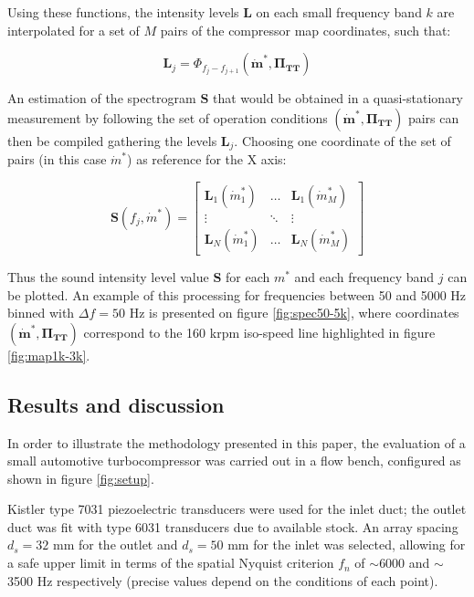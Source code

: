 Using these functions, the intensity levels $\mathbf L$ on each small frequency band $k$ are interpolated for a set of $M$ pairs of the compressor map coordinates, such that:

\begin{equation}
 \mathbf L_j=\Phi_{f_j-f_{j+1}}(\mathbf{\dot m^*},\mathbf{\Pi_\text{TT}})
\end{equation}

An estimation of the spectrogram $\mathbf S$ that would be obtained in a quasi-stationary measurement by following the set of operation conditions $(\mathbf{\dot m^*},\mathbf{\Pi_\text{TT}})$ pairs can then be compiled gathering the levels $\mathbf L_j$. Choosing one coordinate of the set of pairs (in this case $\dot m^*$) as reference for the X axis:

\begin{equation}
  \mathbf S(f_j,\dot m^*)=\begin{bmatrix}
    \mathbf L_1(\dot m^*_1) & \hdots & \mathbf L_1(\dot m^*_M)\\
    \vdots & \ddots & \vdots \\
    \mathbf L_N(\dot m^*_1) & \hdots & \mathbf L_N(\dot m^*_M)
  \end{bmatrix}
\end{equation}

Thus the sound intensity level value $\mathbf S$ for each $m^*$ and each frequency band $j$ can be plotted. An example of this processing for frequencies between 50 and 5000 Hz binned with $\Delta f = 50$ Hz is presented on figure \ref{fig:spec50-5k}, where coordinates $(\mathbf{\dot m^*},\mathbf{\Pi_\text{TT}})$ correspond to the 160 krpm iso-speed line highlighted in figure \ref{fig:map1k-3k}.

\subsection{Results and discussion}
\label{sec:results_and_discussion}

In order to illustrate the methodology presented in this paper, the evaluation of a small automotive turbocompressor was carried out in a flow bench, configured as shown in figure \ref{fig:setup}.

Kistler type 7031 piezoelectric transducers were used for the inlet duct; the outlet duct was fit with type 6031 transducers due to available stock. An array spacing $d_s=32$ mm for the outlet and $d_s=50$ mm for the inlet was selected, allowing for a safe upper limit in terms of the spatial Nyquist criterion $f_n$ of $\sim$6000 and $\sim$3500 Hz respectively (precise values depend on the conditions of each point).

